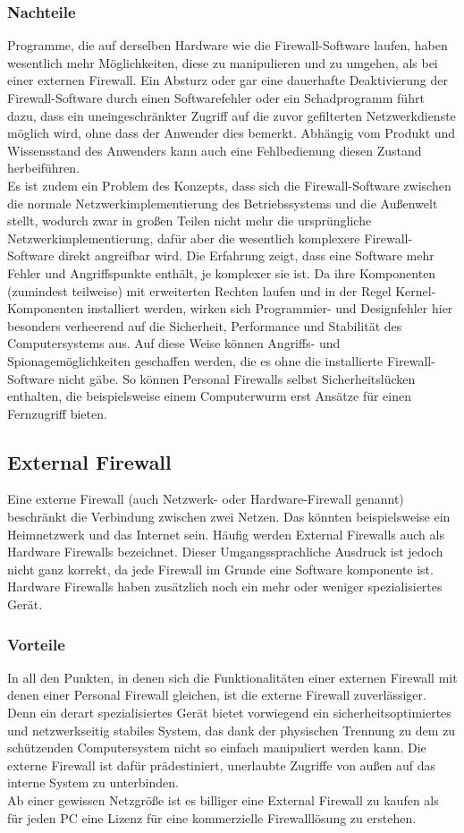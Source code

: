 \subsubsection{Nachteile}
Programme, die auf derselben Hardware wie die Firewall-Software laufen, haben wesentlich mehr Möglichkeiten, diese zu manipulieren und zu umgehen, als bei einer externen Firewall. Ein Absturz oder gar eine dauerhafte Deaktivierung der Firewall-Software durch einen Softwarefehler oder ein Schadprogramm führt dazu, dass ein uneingeschränkter Zugriff auf die zuvor gefilterten Netzwerkdienste möglich wird, ohne dass der Anwender dies bemerkt. Abhängig vom Produkt und Wissensstand des Anwenders kann auch eine Fehlbedienung diesen Zustand herbeiführen.\\
Es ist zudem ein Problem des Konzepts, dass sich die Firewall-Software zwischen die normale Netzwerkimplementierung des Betriebssystems und die Außenwelt stellt, wodurch zwar in großen Teilen nicht mehr die ursprüngliche Netzwerkimplementierung, dafür aber die wesentlich komplexere Firewall-Software direkt angreifbar wird. Die Erfahrung zeigt, dass eine Software mehr Fehler und Angriffspunkte enthält, je komplexer sie ist. Da ihre Komponenten (zumindest teilweise) mit erweiterten Rechten laufen und in der Regel Kernel-Komponenten installiert werden, wirken sich Programmier- und Designfehler hier besonders verheerend auf die Sicherheit, Performance und Stabilität des Computersystems aus. Auf diese Weise können Angriffs- und Spionagemöglichkeiten geschaffen werden, die es ohne die installierte Firewall-Software nicht gäbe. So können Personal Firewalls selbst Sicherheitslücken enthalten, die beispielsweise einem Computerwurm erst Ansätze für einen Fernzugriff bieten.\\
\subsection{External Firewall}
Eine externe Firewall (auch Netzwerk- oder Hardware-Firewall genannt) beschränkt die Verbindung zwischen zwei Netzen. Das könnten beispielsweise ein Heimnetzwerk und das Internet sein.
Häufig werden External Firewalls auch als Hardware Firewalls bezeichnet. Dieser Umgangssprachliche Ausdruck ist jedoch nicht ganz korrekt, da jede Firewall im Grunde eine Software komponente ist. Hardware Firewalls haben zusätzlich noch ein mehr oder weniger spezialisiertes Gerät.
\subsubsection{Vorteile}
In all den Punkten, in denen sich die Funktionalitäten einer externen Firewall mit denen einer Personal Firewall gleichen, ist die externe Firewall zuverlässiger. Denn ein derart spezialisiertes Gerät bietet vorwiegend ein sicherheitsoptimiertes und netzwerkseitig stabiles System, das dank der physischen Trennung zu dem zu schützenden Computersystem nicht so einfach manipuliert werden kann. Die externe Firewall ist dafür prädestiniert, unerlaubte Zugriffe von außen auf das interne System zu unterbinden.\\
Ab einer gewissen Netzgröße ist es billiger eine External Firewall zu kaufen als für jeden PC eine Lizenz für eine kommerzielle Firewalllösung zu erstehen.
